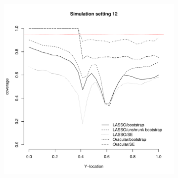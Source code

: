 \documentclass[authoryear, review, 11pt]{elsarticle}
\begin{document}
\begin{figure}
\begin{subfigure}[b]{0.3\textwidth}
			\label{fig:tiger}
		\end{subfigure}
        ~ %
		\begin{subfigure}[b]{0.3\textwidth}
			\centering
			\includegraphics[width=\textwidth]{../../figures/simulation/28-12-profile-coverage.pdf}
			\label{fig:mouse}
		\end{subfigure}
	\end{figure}
	
\end{document}
